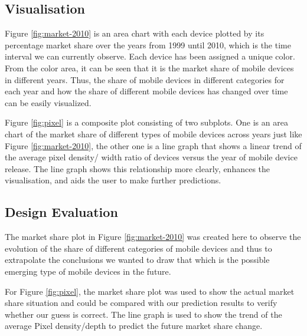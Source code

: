 \documentclass[conference]{IEEEtran}
\begin{document}

\subsection{Visualisation}
Figure \ref{fig:market-2010} is an area chart with each device plotted by its percentage market share over the years from 1999 until 2010, which is the time interval we can currently observe. Each device has been assigned a unique color. From the color area, it can be seen that it is the market share of mobile devices in different years. Thus, the share of mobile devices in different categories for each year and how the share of different mobile devices has changed over time can be easily visualized.

Figure \ref{fig:pixel} is a composite plot consisting of two subplots. One is an area chart of the market share of different types of mobile devices across years just like Figure \ref{fig:market-2010}, the other one is a line graph that shows a linear trend of the average pixel density/ width ratio of devices versus the year of mobile device release. The line graph shows this relationship more clearly, enhances the visualisation, and aids the user to make further predictions.

\subsection{Design Evaluation}
The market share plot in Figure \ref{fig:market-2010} was created here to observe the evolution of the share of different categories of mobile devices and thus to extrapolate the conclusions we wanted to draw that which is the possible emerging type of mobile devices in the future.

For Figure \ref{fig:pixel}, the market share plot was used to show the actual market share situation and could be compared with our prediction results to verify whether our guess is correct. The line graph is used to show the trend of the average Pixel density/depth to predict the future market share change.
\end{document}
